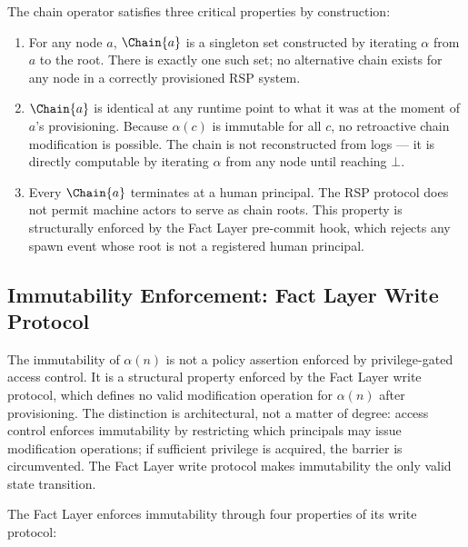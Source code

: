 The chain operator satisfies three critical properties by construction:

\begin{enumerate}
\item[(C1) \textbf{Uniqueness}] For any node $a$, $\Chain{a}$ is a singleton set constructed by iterating $\alpha$ from $a$ to the root. There is exactly one such set; no alternative chain exists for any node in a correctly provisioned RSP system.

\item[(C2) \textbf{Determinism}] $\Chain{a}$ is identical at any runtime point to what it was at the moment of $a$'s provisioning. Because $\alpha(c)$ is immutable for all $c$, no retroactive chain modification is possible. The chain is not reconstructed from logs --- it is directly computable by iterating $\alpha$ from any node until reaching $\bot$.

\item[(C3) \textbf{Human termination}] Every $\Chain{a}$ terminates at a human principal. The RSP protocol does not permit machine actors to serve as chain roots. This property is structurally enforced by the Fact Layer pre-commit hook, which rejects any spawn event whose root is not a registered human principal.
\end{enumerate}

\subsection{Immutability Enforcement: Fact Layer Write Protocol}
\label{sec:fact-layer-write-protocol}

The immutability of $\alpha(n)$ is not a policy assertion enforced by privilege-gated access control. It is a structural property enforced by the Fact Layer write protocol, which defines no valid modification operation for $\alpha(n)$ after provisioning. The distinction is architectural, not a matter of degree: access control enforces immutability by restricting which principals may issue modification operations; if sufficient privilege is acquired, the barrier is circumvented. The Fact Layer write protocol makes immutability the only valid state transition.

The Fact Layer enforces immutability through four properties of its write protocol:

